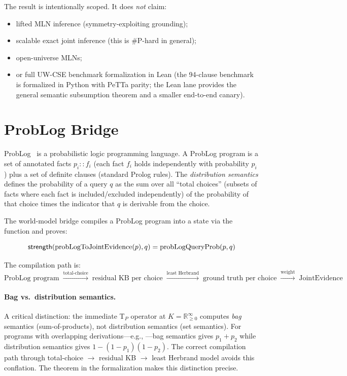 \documentclass[11pt,openany]{report}
\begin{document}
The result is intentionally scoped.  It does \emph{not} claim:
\begin{itemize}
\item lifted MLN inference (symmetry-exploiting grounding);
\item scalable exact joint inference (this is \#P-hard in general);
\item open-universe MLNs;
\item or full UW-CSE benchmark formalization in Lean (the 94-clause
  benchmark is formalized in Python with PeTTa parity; the Lean lane
  provides the general semantic subsumption theorem and a smaller
  end-to-end canary).
\end{itemize}


\section{ProbLog Bridge}
\label{sec:problog-bridge}

ProbLog~\cite{DeRaedt2007ProbLog} is a probabilistic logic programming
language.  A ProbLog program is a set of annotated facts
$p_i :: f_i$ (each fact $f_i$ holds independently with probability $p_i$)
plus a set of definite clauses (standard Prolog rules).  The \emph{distribution
semantics} defines the probability of a query $q$ as the sum over all
``total choices'' (subsets of facts where each fact is included/excluded
independently) of the probability of that choice times the indicator that
$q$ is derivable from the choice.

The world-model bridge compiles a ProbLog program into a
 state via the  function
and proves:

\begin{theorem}
\[
  \mathsf{strength}(\mathrm{probLogToJointEvidence}(p), q)
    = \mathrm{probLogQueryProb}(p, q)
\]
\end{theorem}

\noindent
The compilation path is:
\[
  \text{ProbLog program} \;\xrightarrow{\text{total-choice}}\;
  \text{residual KB per choice} \;\xrightarrow{\text{least Herbrand}}\;
  \text{ground truth per choice} \;\xrightarrow{\text{weight}}\;
  \text{JointEvidence}
\]

\paragraph{Bag vs.\ distribution semantics.}
A critical distinction: the immediate T$_P$ operator at
$K = \mathbb{R}_{\ge 0}^\infty$ computes \emph{bag} semantics
(sum-of-products), not distribution semantics (set semantics).  For
programs with overlapping derivations---e.g.,
---bag semantics gives $p_1 + p_2$ while
distribution semantics gives $1 - (1 - p_1)(1 - p_2)$.  The correct
compilation path through total-choice $\to$ residual KB $\to$ least
Herbrand model avoids this conflation.  The 
theorem in the formalization makes this distinction precise.
\end{document}
